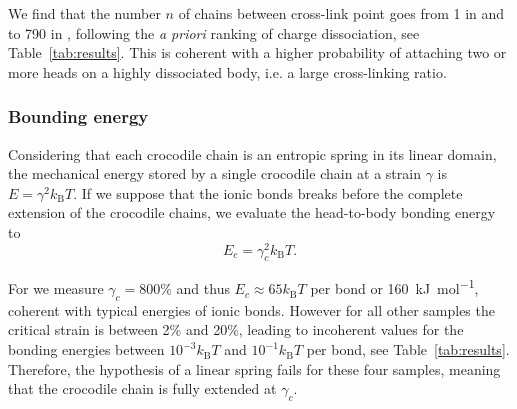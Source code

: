 \documentclass[journal=jacsat,manuscript=article]{achemso}
\begin{document}
We find that the number $n$ of chains between cross-link point goes from 1 in  and  to 790 in , following the \textit{a priori} ranking of charge dissociation, see Table~\ref{tab:results}. This is coherent with a higher probability of attaching two or more heads on a highly dissociated body, i.e. a large cross-linking ratio.

\subsubsection{Bounding energy}

Considering that each crocodile chain is an entropic spring in its linear domain, the mechanical energy stored by a single crocodile chain at a strain $\gamma$ is $E = \gamma^2 k_\mathrm{B}T$. If we suppose that the ionic bonds breaks before the complete extension of the crocodile chains, we evaluate the head-to-body bonding energy to
\begin{equation}
E_c = \gamma_c^2 k_\mathrm{B}T.
\label{eq:Ec}
\end{equation}

For  we measure $\gamma_c = 800\%$ and thus $E_c \approx 65 k_\mathrm{B}T$ per bond or \SI{160}{\kilo\joule\per\mol}, coherent with typical energies of ionic bonds. However for all other samples the critical strain is between 2\% and 20\%, leading to incoherent values for the bonding energies between $10^{-3}k_\mathrm{B}T$ and $10^{-1}k_\mathrm{B}T$ per bond, see Table~\ref{tab:results}. Therefore, the hypothesis of a linear spring fails for these four samples, meaning that the crocodile chain is fully extended at $\gamma_c$.

\end{document}
